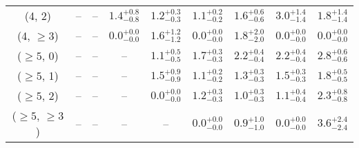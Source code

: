\begin{table}[h!]
{\begin{tabular}{ccccccccc}
	(4, 2) & -- & -- & $1.4^{+ 0.8 }_{- 0.8 }$ & $1.2^{+ 0.3 }_{- 0.3 }$ & $1.1^{+ 0.2 }_{- 0.2 }$ & $1.6^{+ 0.6 }_{- 0.6 }$ & $3.0^{+ 1.4 }_{- 1.4 }$ & $1.8^{+ 1.4 }_{- 1.4 }$ \\[0.5ex] 
	(4, $\ge3$) & -- & -- & $0.0^{+ 0.0 }_{- 0.0 }$ & $1.6^{+ 1.2 }_{- 1.2 }$ & $0.0^{+ 0.0 }_{- 0.0 }$ & $1.8^{+ 2.0 }_{- 2.0 }$ & $0.0^{+ 0.0 }_{- 0.0 }$ & $0.0^{+ 0.0 }_{- 0.0 }$ \\[0.5ex] 
	($\ge5$, 0) & -- & -- & -- & $1.1^{+ 0.5 }_{- 0.5 }$ & $1.7^{+ 0.3 }_{- 0.3 }$ & $2.2^{+ 0.4 }_{- 0.4 }$ & $2.2^{+ 0.4 }_{- 0.4 }$ & $2.8^{+ 0.6 }_{- 0.6 }$ \\[0.5ex] 
	($\ge5$, 1) & -- & -- & -- & $1.5^{+ 0.9 }_{- 0.9 }$ & $1.1^{+ 0.2 }_{- 0.2 }$ & $1.3^{+ 0.3 }_{- 0.3 }$ & $1.5^{+ 0.3 }_{- 0.3 }$ & $1.8^{+ 0.5 }_{- 0.5 }$ \\[0.5ex] 
	($\ge5$, 2) & -- & -- & -- & $0.0^{+ 0.0 }_{- 0.0 }$ & $1.2^{+ 0.3 }_{- 0.3 }$ & $1.0^{+ 0.3 }_{- 0.3 }$ & $1.1^{+ 0.4 }_{- 0.4 }$ & $2.3^{+ 0.8 }_{- 0.8 }$ \\[0.5ex] 
	($\ge5$, $\ge3$) & -- & -- & -- & -- & $0.0^{+ 0.0 }_{- 0.0 }$ & $0.9^{+ 1.0 }_{- 1.0 }$ & $0.0^{+ 0.0 }_{- 0.0 }$ & $3.6^{+ 2.4 }_{- 2.4 }$ \\[0.5ex] 
	\hline
	\hline
\end{tabular}}
\end{table}
